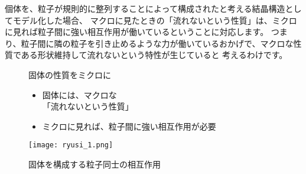 \documentclass[uplatex,dvipdfmx,a4paper,11pt]{jsarticle}
\begin{document}
個体を、粒子が規則的に整列することによって構成されたと考える結晶構造としてモデル化した場合、
マクロに見たときの「流れないという性質」は、ミクロに見れば粒子間に強い相互作用が働いているということに対応します。
つまり、粒子間に隣の粒子を引き止めるような力が働いているおかげで、マクロな性質である形状維持して流れないという特性が生じていると
考えるわけです。
\begin{figure}[htb]
	\begin{center}
		\begin{minipage}{0.4\textwidth}
			\large
			\begin{itembox}[l]{固体の性質をミクロに}
				\begin{itemize}
					\item 固体には、マクロな\\「流れないという性質」
					\item ミクロに見れば、粒子間に強い相互作用が必要
				\end{itemize}
			\end{itembox}
		\end{minipage}
		\begin{minipage}{0.5\textwidth}
			\begin{center}
			\texttt{[image: ryusi\_1.png]}
			\end{center}
		\end{minipage}
		\caption{固体を構成する粒子同士の相互作用}
		\label{fig:ryusi}
	\end{center}
\end{figure}
\end{document}
